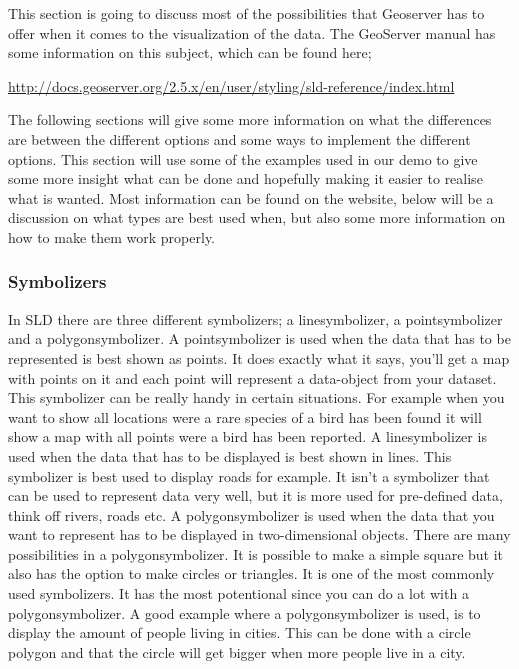This section is going to discuss most of the possibilities that Geoserver has to offer when it comes to the visualization of the data. The GeoServer manual has some information on this subject, which can be found here;

\url{http://docs.geoserver.org/2.5.x/en/user/styling/sld-reference/index.html}

The following sections will give some more information on what the differences are between the different options and some ways to implement the different options. This section will use some of the examples used in our demo to give some more insight what can be done and hopefully making it easier to realise what is wanted. Most information can be found on the website, below will be a discussion on what types are best used when, but also some more information on how to make them work properly.

\subsubsection{Symbolizers}

In SLD there are three different symbolizers; a linesymbolizer, a pointsymbolizer and a polygonsymbolizer. A pointsymbolizer is used when the data that has to be represented is best shown as points. It does exactly what it says, you'll get a map with points on it and each point will represent a data-object from your dataset. This symbolizer can be really handy in certain situations. For example when you want to show all locations were a rare species of a bird has been found it will show a map with all points were a bird has been reported.
\newline
\newline
A linesymbolizer is used when the data that has to be displayed is best shown in lines. This symbolizer is best used to display roads for example. It isn't a symbolizer that can be used to represent data very well, but it is more used for pre-defined data, think off rivers, roads etc.
\newline
\newline
A polygonsymbolizer is used when the data that you want to represent has to be displayed in two-dimensional objects. There are many possibilities in a polygonsymbolizer. It is possible to make a simple square but it also has the option to make circles or triangles. It is one of the most commonly used symbolizers. It has the most potentional since you can do a lot with a polygonsymbolizer. A good example where a polygonsymbolizer is used, is to display the amount of people living in cities. This can be done with a circle polygon and that the circle will get bigger when more people live in a city.

